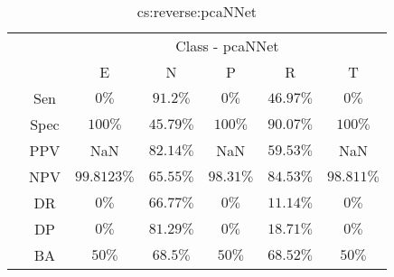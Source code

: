 \begin{table}[!ht]
	\centering
	\begin{tabular}{|c|c|c|c|c|c|c|}
		\cline{3-7}
		\multicolumn{2}{c|}{} & \multicolumn{5}{c|}{Class - pcaNNet} \\ \cline{3-7}
		\multicolumn{2}{c|}{} & E & N & P & R & T \\ \hline
		\multirow{7}{*}{\rotatebox{90}{Statistics}} & Sen & $0\%$ & $91.2\%$ & $0\%$ & $46.97\%$ & $0\%$ \\ \cline{2-7}
		 & Spec & $100\%$ & $45.79\%$ & $100\%$ & $90.07\%$ & $100\%$ \\ \cline{2-7}
		 & PPV & NaN & $82.14\%$ & NaN & $59.53\%$ & NaN \\ \cline{2-7}
		 & NPV & $99.8123\%$ & $65.55\%$ & $98.31\%$ & $84.53\%$ & $98.811\%$ \\ \cline{2-7}
		 & DR & $0\%$ & $66.77\%$ & $0\%$ & $11.14\%$ & $0\%$ \\ \cline{2-7}
		 & DP & $0\%$ & $81.29\%$ & $0\%$ & $18.71\%$ & $0\%$ \\ \cline{2-7}
		 & BA & $50\%$ & $68.5\%$ & $50\%$ & $68.52\%$ & $50\%$ \\ \hline
	\end{tabular}
	\caption{cs:reverse:pcaNNet}
	\label{tab:cs:reverse:pcaNNet}
\end{table}
